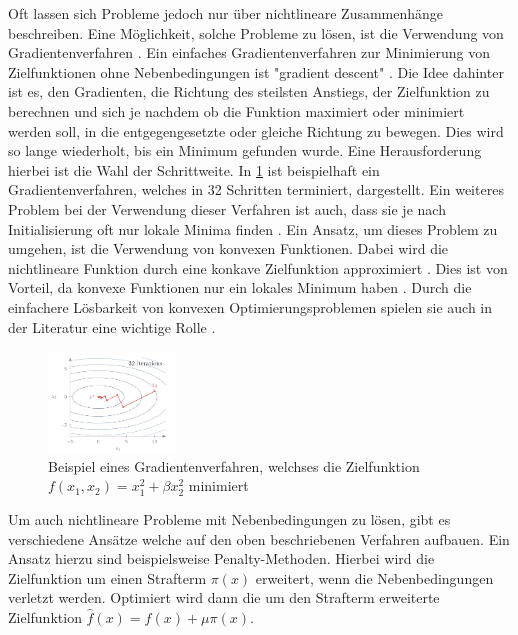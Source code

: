 Oft lassen sich Probleme jedoch nur über nichtlineare Zusammenhänge beschreiben.
Eine Möglichkeit, solche Probleme zu lösen, ist die Verwendung von
Gradientenverfahren \cite[153]{marti21bo}. Ein einfaches Gradientenverfahren zur
Minimierung von Zielfunktionen ohne Nebenbedingungen ist "gradient descent"
\cite[110]{marti21bo}. Die Idee dahinter ist es, den Gradienten, die Richtung
des steilsten Anstiegs, der Zielfunktion zu berechnen und sich je nachdem ob die
Funktion maximiert oder minimiert werden soll, in die entgegengesetzte oder
gleiche Richtung zu bewegen. Dies wird so lange wiederholt, bis ein Minimum
gefunden wurde. Eine Herausforderung hierbei ist die Wahl der Schrittweite. In
\ref*{fig:gradient} ist beispielhaft  ein Gradientenverfahren, welches in 32
Schritten terminiert, dargestellt. Ein weiteres Problem bei der Verwendung
dieser Verfahren ist auch, dass sie je nach Initialisierung oft nur lokale
Minima finden \cite[9]{boyd04bo}. Ein Ansatz, um dieses Problem zu umgehen, ist
die Verwendung von konvexen Funktionen. Dabei wird die nichtlineare Funktion
durch eine konkave Zielfunktion approximiert \cite[11]{boyd04bo}. Dies ist von
Vorteil, da konvexe Funktionen nur ein lokales Minimum haben
\cite[7]{noced06bo}. Durch die einfachere Lösbarkeit von konvexen
Optimierungsproblemen spielen sie auch in der Literatur eine wichtige Rolle
\cite[8]{boyd04bo}.

\begin{figure}[h]
    \centering
    \includegraphics[width=0.3\textwidth]{figures/[marti21bo Gradient].png}
    \caption{Beispiel eines Gradientenverfahren, welchses die Zielfunktion \\
    $f(x_1,x_2)=x_1^2+\beta x_2^2$ minimiert  \cite[112]{marti21bo}}
    \label{fig:gradient}
\end{figure}

Um auch nichtlineare Probleme mit Nebenbedingungen zu lösen, gibt es
verschiedene Ansätze welche auf den oben beschriebenen Verfahren aufbauen. Ein
Ansatz hierzu sind beispielsweise  Penalty-Methoden. Hierbei wird die
Zielfunktion um einen Strafterm $\pi(x)$ erweitert, wenn die Nebenbedingungen
verletzt werden. Optimiert wird dann die um den Strafterm erweiterte
Zielfunktion $\hat{f}(x)=f(x)+\mu\pi(x)$.
\cite[175]{marti21bo}




